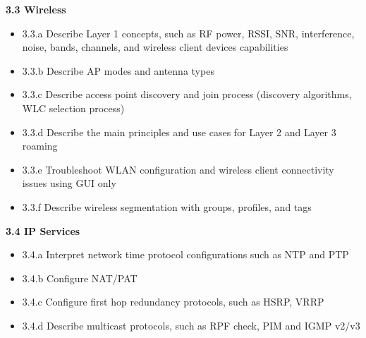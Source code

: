 \documentclass{article}
\begin{document}
\textbf{3.3 Wireless}
\begin{itemize}
\item 3.3.a Describe Layer 1 concepts, such as RF power, RSSI, SNR, interference, noise, bands, channels, and wireless client devices capabilities
\item 3.3.b Describe AP modes and antenna types
\item 3.3.c Describe access point discovery and join process (discovery algorithms, WLC selection process)
\item 3.3.d Describe the main principles and use cases for Layer 2 and Layer 3 roaming
\item 3.3.e Troubleshoot WLAN configuration and wireless client connectivity issues using GUI only
\item 3.3.f Describe wireless segmentation with groups, profiles, and tags
\end{itemize}


\textbf{3.4 IP Services}
\begin{itemize}
\item 3.4.a Interpret network time protocol configurations such as NTP and PTP
\item 3.4.b Configure NAT/PAT
\item 3.4.c Configure first hop redundancy protocols, such as HSRP, VRRP
\item 3.4.d Describe multicast protocols, such as RPF check, PIM and IGMP v2/v3
\end{itemize}
\end{document}

